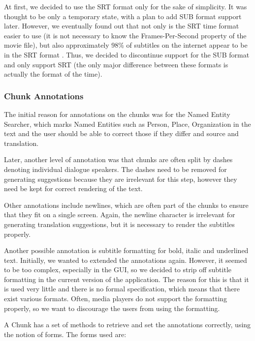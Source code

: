 At first, we decided to use the SRT format only for the sake of simplicity.
It was thought to be only a temporary state, with a plan to add SUB format support later. However, we eventually found out that not only is the SRT time format easier to use (it is not necessary to know the Frames-Per-Second property of the movie file),
but also approximately 98\% of subtitles on the internet appear to be in the SRT format .
Thus, we decided to discontinue support for the SUB format and only support SRT (the only major difference between these formats is actually the format of the time).

\subsubsection{Chunk Annotations}

The initial reason for annotations on the chunks was for the Named Entity Searcher, which marks Named Entities such as Person, Place, Organization in the text and the user should be able to correct those if they differ and source and translation.

Later, another level of annotation was that chunks are often split by dashes denoting individual dialogue speakers. The dashes need to be removed for generating suggestions because they are irrelevant for this step, however they need be kept for correct rendering of the text.

Other annotations include newlines, which are often part of the chunks to ensure that they fit on a single screen. Again, the newline character is irrelevant for generating translation suggestions, but it is necessary to render the subtitles properly.

Another possible annotation is subtitle formatting for bold, italic and underlined text. Initially, we wanted to extended the annotations again. However, it seemed to be too complex, especially in the GUI, so we decided to strip off subtitle formatting in the current version of the application. The reason for this is that it is used very little and there is no formal specification, which means that there exist various formats. Often, media players do not support the formatting properly, so we want to discourage the users from using the formatting.

A Chunk has a set of methods to retrieve and set the annotations correctly, using the notion of forms. The forms used are:

